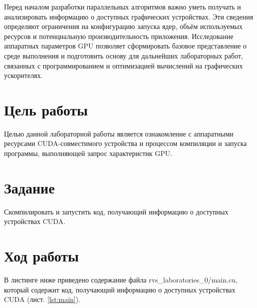 \documentclass[14pt]{extarticle}
\makeatletter
\newcommand{\numbersections}{\renewcommand{\Hy@numberline}[1]{##1~}}
\let\oldsection\section
\renewcommand{\section}{\numbersections\oldsection}
\makeatother
\begin{document}
Перед началом разработки параллельных алгоритмов важно уметь получать и анализировать информацию о доступных графических устройствах. Эти сведения определяют ограничения на конфигурацию запуска ядер, объём используемых ресурсов и потенциальную производительность приложения. Исследование аппаратных параметров GPU позволяет сформировать базовое представление о среде выполнения и подготовить основу для дальнейших лабораторных работ, связанных с программированием и оптимизацией вычислений на графических ускорителях.

\section{Цель работы}

Целью данной лабораторной работы является ознакомление с аппаратными ресурсами CUDA-совместимого устройства и процессом компиляции и запуска программы, выполняющей запрос характеристик GPU.

\section{Задание}

Скомпилировать и запустить код, получающий информацию о доступных устройствах CUDA.

\section{Ход работы}

В листинге ниже приведено содержание файла rvs\_laboratories\_0/main.cu, который содержит код, получающий информацию о доступных устройствах CUDA (лист. \ref{lst:main}).
\end{document}
